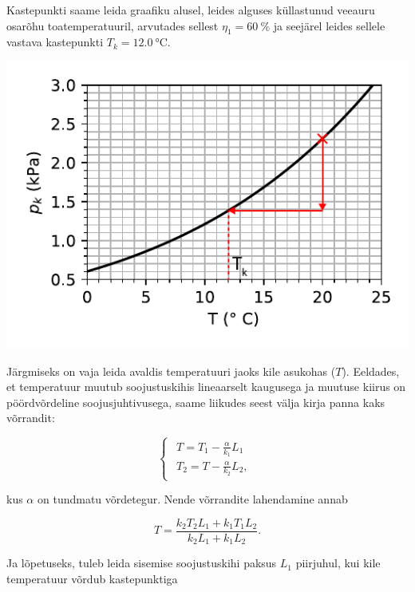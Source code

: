 {Kastepunkti saame leida graafiku alusel, leides alguses küllastunud
veeauru osarõhu toatemperatuuril, arvutades sellest $\eta_{1}=\SI{60}{\percent}$
ja seejärel leides sellele vastava kastepunkti $T_{k}=\SI{12.0}{\celsius}.$
\begin{center}
\includegraphics[scale=0.9]{2018-v3g-05-kullastunud-aur-lah}
\par\end{center}

Järgmiseks on vaja leida avaldis temperatuuri jaoks kile asukohas
($T$). Eeldades, et temperatuur muutub soojustuskihis lineaarselt
kaugusega ja muutuse kiirus on pöördvõrdeline soojusjuhtivusega, saame
liikudes seest välja kirja panna kaks võrrandit:

\begin{equation*}
\begin{cases}
\begin{array}{c}
T=T_{1}-\frac{\alpha}{k_{1}}L_{1}\\
T_{2}=T-\frac{\alpha}{k_{2}}L_{2},
\end{array}
\end{cases}
\end{equation*}

\noindent kus $\alpha$ on tundmatu võrdetegur. Nende võrrandite lahendamine
annab

\begin{equation*}
T=\frac{k_{2}T_{2}L_{1}+k_{1}T_{1}L_{2}}{k_{2}L_{1}+k_{1}L_{2}}.
\end{equation*}

Ja lõpetuseks, tuleb leida sisemise soojustuskihi paksus $L_{1}$
piirjuhul, kui kile temperatuur võrdub kastepunktiga

}
